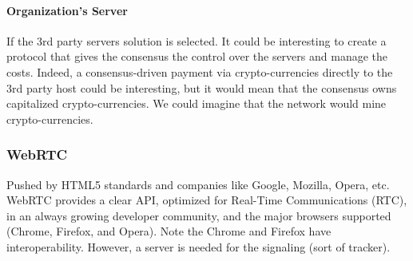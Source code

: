 \paragraph{Organization's Server} If the 3rd party servers solution is selected. It could be interesting to create a protocol that gives the consensus the control over the servers and manage the costs. Indeed, a consensus-driven payment via crypto-currencies directly to the 3rd party host could be interesting, but it would mean that the consensus owns capitalized crypto-currencies. We could imagine that the network would mine crypto-currencies.

\subsubsection{WebRTC}
Pushed by HTML5 standards and companies like Google, Mozilla, Opera, etc. WebRTC\cite{GoogleWebRTC} provides a clear API, optimized for Real-Time Communications (RTC), in an always growing developer community, and the major browsers supported (Chrome, Firefox, and Opera). Note the Chrome and Firefox have interoperability. However, a server is needed for the signaling (sort of tracker).

